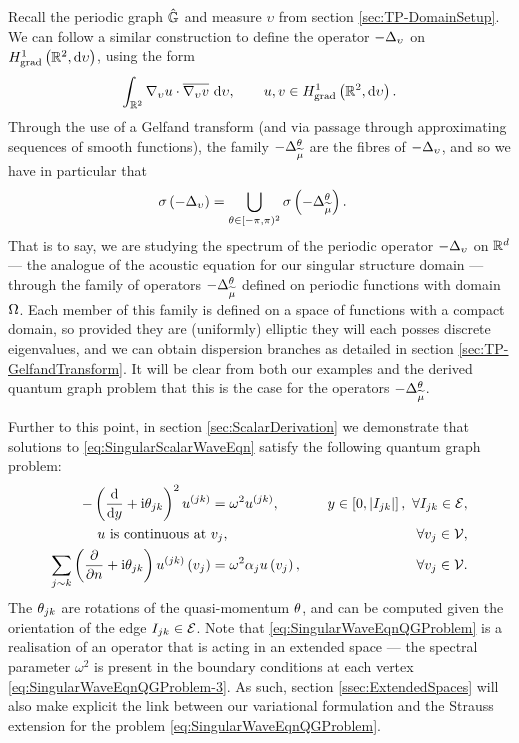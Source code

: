 Recall the periodic graph $\hat{\mathbb{G}}$ and measure $\upsilon$ from section \ref{sec:TP-DomainSetup}.
We can follow a similar construction to define the operator $-\Delta_{\upsilon}$ on $H^1_\mathrm{grad}\left( \mathbb{R}^2, \mathrm{d}\upsilon \right)$, using the form
\begin{align*}
	\int_{\mathbb{R}^2} \nabla_{\upsilon}u\cdot\overline{\nabla_{\upsilon}v}  \ \mathrm{d}\upsilon,
	\qquad u,v\in H^1_\mathrm{grad}\left( \mathbb{R}^2, \mathrm{d}\upsilon \right).
\end{align*}
Through the use of a Gelfand transform (and via passage through approximating sequences of smooth functions), the family $-\Delta_{\widetilde{\mu}}^{\theta}$ are the fibres of $-\Delta_{\upsilon}$, and so we have in particular that
\begin{align*}
	\sigma\left(  -\Delta_{\upsilon}  \right) &= \bigcup_{\theta\in[-\pi,\pi)^2} \sigma\left(  -\Delta_{\widetilde{\mu}}^{\theta}  \right).
\end{align*}
That is to say, we are studying the spectrum of the periodic operator $-\Delta_{\upsilon}$ on $\mathbb{R}^d$ --- the analogue of the acoustic equation for our singular structure domain --- through the family of operators $-\Delta_{\widetilde{\mu}}^{\theta}$ defined on periodic functions with domain $\Omega$.
Each member of this family is defined on a space of functions with a compact domain, so provided they are (uniformly) elliptic they will each posses discrete eigenvalues, and we can obtain dispersion branches as detailed in section \ref{sec:TP-GelfandTransform}.
It will be clear from both our examples and the derived quantum graph problem that this is the case for the operators $-\Delta_{\widetilde{\mu}}^{\theta}$.

Further to this point, in section \ref{sec:ScalarDerivation} we demonstrate that solutions to \eqref{eq:SingularScalarWaveEqn} satisfy the following quantum graph problem:
\begin{subequations} \label{eq:SingularWaveEqnQGProblem}
	\begin{align}
		-\left( \dfrac{\mathrm{d}}{\mathrm{d}y} + \mathrm{i}\theta_{jk} \right)^2 u^{(jk)} &= \omega^2 u^{(jk)}, \quad &y\in\left[ 0,\left\lvert I_{jk} \right\rvert \right], \ \forall I_{jk}\in\mathcal{E}, \label{eq:SingularWaveEqnQGProblem-1} \\
		u \text{ is continuous at } & v_j, \quad &\forall v_j\in\mathcal{V}, \label{eq:SingularWaveEqnQGProblem-2} \\
		\sum_{j\sim k}\left( \dfrac{\partial }{\partial n} + \mathrm{i}\theta_{jk} \right)u^{(jk)}\left( v_j \right) &= \omega^2\alpha_j u\left( v_j \right), \quad &\forall v_j\in\mathcal{V}. \label{eq:SingularWaveEqnQGProblem-3}
	\end{align}
\end{subequations}
The $\theta_{jk}$ are rotations of the quasi-momentum $\theta$, and can be computed given the orientation of the edge $I_{jk}\in\mathcal{E}$.
Note that \eqref{eq:SingularWaveEqnQGProblem} is a realisation of an operator that is acting in an extended space --- the spectral parameter $\omega^2$ is present in the boundary conditions at each vertex \eqref{eq:SingularWaveEqnQGProblem-3}.
As such, section \ref{ssec:ExtendedSpaces} will also make explicit the link between our variational formulation and the Strauss extension for the problem \eqref{eq:SingularWaveEqnQGProblem}.

